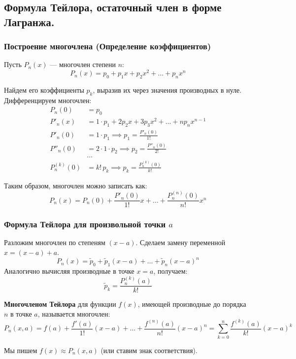 \subsection{Формула Тейлора, остаточный член в форме Лагранжа.}

\subsubsection*{Построение многочлена (Определение коэффициентов)}

Пусть $P_n(x)$ — многочлен степени $n$:
\[ P_n(x) = p_0 + p_1 x + p_2 x^2 + \dots + p_n x^n \]

Найдем его коэффициенты $p_k$, выразив их через значения производных в нуле.
Дифференцируем многочлен:
\begin{align*}
    P_n(0) &= p_0 \\
    P'_n(x) &= 1 \cdot p_1 + 2p_2 x + 3p_3 x^2 + \dots + n p_n x^{n-1} \\
    P'_n(0) &= 1 \cdot p_1 \implies p_1 = \frac{P'_n(0)}{1!} \\
    P''_n(0) &= 2 \cdot 1 \cdot p_2 \implies p_2 = \frac{P''_n(0)}{2!} \\
    &\dots \\
    P^{(k)}_n(0) &= k! \, p_k \implies p_k = \frac{P^{(k)}_n(0)}{k!}
\end{align*}

Таким образом, многочлен можно записать как:
\[ P_n(x) = P_n(0) + \frac{P'_n(0)}{1!}x + \dots + \frac{P^{(n)}_n(0)}{n!}x^n \]

\subsubsection*{Формула Тейлора для произвольной точки $a$}

Разложим многочлен по степеням $(x-a)$. Сделаем замену переменной $x = (x-a) + a$.
\[ P_n(x) = \tilde{p}_0 + \tilde{p}_1(x-a) + \dots + \tilde{p}_n(x-a)^n \]
Аналогично вычисляя производные в точке $x=a$, получаем:
\[ \tilde{p}_k = \frac{P^{(k)}_n(a)}{k!} \]

\begin{tcolorbox}[title=Определение]
    \textbf{Многочленом Тейлора} для функции $f(x)$, имеющей производные до порядка $n$ в точке $a$, называется многочлен:
    \[ P_n(x, a) = f(a) + \frac{f'(a)}{1!}(x-a) + \dots + \frac{f^{(n)}(a)}{n!}(x-a)^n = \sum_{k=0}^n \frac{f^{(k)}(a)}{k!}(x-a)^k \]
\end{tcolorbox}
Мы пишем $f(x) \approx P_n(x, a)$ (или ставим знак соответствия).

